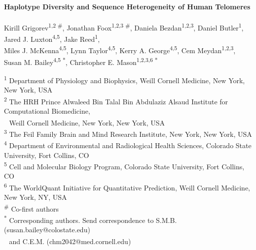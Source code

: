 \documentclass{article}
\begin{document}
\begin{center}
    \Large{\textbf{Haplotype Diversity and Sequence Heterogeneity of Human Telomeres}}
    \\~\\
    \small{
        Kirill Grigorev\textsuperscript{1,2 \#},
        Jonathan Foox\textsuperscript{1,2,3 \#},
        Daniela Bezdan\textsuperscript{1,2,3},
        Daniel Butler\textsuperscript{1},
        Jared J. Luxton\textsuperscript{4,5},
        Jake Reed\textsuperscript{1},
        \\%
        Miles J. McKenna\textsuperscript{4,5},
        Lynn Taylor\textsuperscript{4,5},
        Kerry A. George\textsuperscript{4,5},
        Cem Meydan\textsuperscript{1,2,3},
        Susan M. Bailey\textsuperscript{4,5 *},
        Christopher E. Mason\textsuperscript{1,2,3,6 *}
    }
\end{center}

\small{ \noindent
    \textsuperscript{1} Department of Physiology and Biophysics, Weill Cornell Medicine, New York, New York, USA
    \\
    \textsuperscript{2} The HRH Prince Alwaleed Bin Talal Bin Abdulaziz Alsaud Institute for Computational Biomedicine, \\
    \textcolor{white}{\textsuperscript{2}} Weill Cornell Medicine, New York, New York, USA
    \\
    \textsuperscript{3} The Feil Family Brain and Mind Research Institute, New York, New York, USA
    \\
    \textsuperscript{4} Department of Environmental and Radiological Health Sciences, Colorado State University, Fort Collins, CO
    \\
    \textsuperscript{5} Cell and Molecular Biology Program, Colorado State University, Fort Collins, CO
    \\
    \textsuperscript{6} The WorldQuant Initiative for Quantitative Prediction, Weill Cornell Medicine, New York, NY, USA
    \\
    \textsuperscript{\#} Co-first authors
    \\
    \textsuperscript{*} Corresponding authors. Send correspondence to S.M.B. (susan.bailey@colostate.edu) \\%
    \textcolor{white}{\textsuperscript{*}} and C.E.M. (chm2042@med.cornell.edu)
}

\normalsize
\doublespacing
\end{document}
